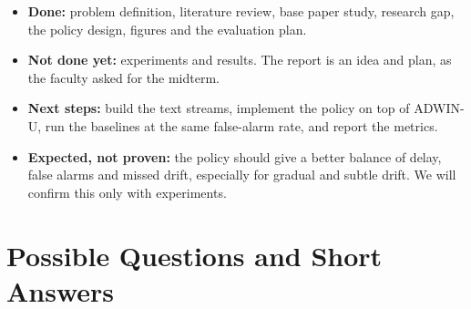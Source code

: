 \documentclass[11pt,a4paper]{article}
\begin{document}
\begin{itemize}
  \item \textbf{Done:} problem definition, literature review, base paper study, research gap, the policy design, figures and the evaluation plan.
  \item \textbf{Not done yet:} experiments and results. The report is an idea and plan, as the faculty asked for the midterm.
  \item \textbf{Next steps:} build the text streams, implement the policy on top of ADWIN-U, run the baselines at the same false-alarm rate, and report the metrics.
  \item \textbf{Expected, not proven:} the policy should give a better balance of delay, false alarms and missed drift, especially for gradual and subtle drift. We will confirm this only with experiments.
\end{itemize}

\section{Possible Questions and Short Answers}
\label{sec:qa}
\end{document}
